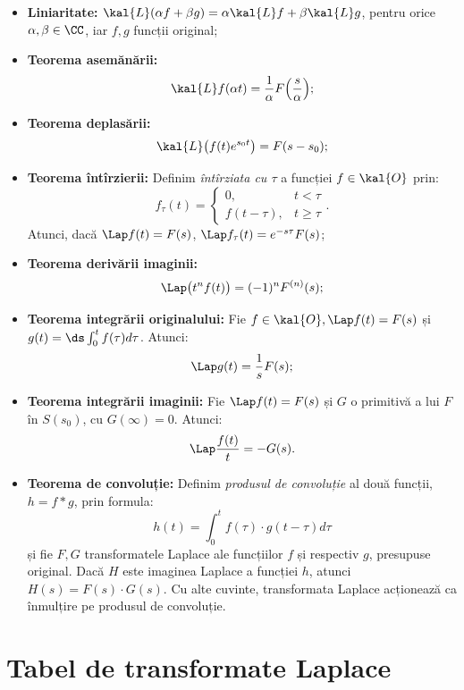 \begin{itemize}
\item \textbf{Liniaritate:} $ \kal{L}(\alpha f + \beta g) = \alpha \kal{L} f + \beta \kal{L} g $,
  pentru orice $ \alpha, \beta \in \CC $, iar $ f, g $ funcții original;
\item \textbf{Teorema asemănării:}
  \[
    \kal{L} f(\alpha t) = \dfrac{1}{\alpha} F \Big( \dfrac{s}{\alpha} \Big);
  \]
\item \textbf{Teorema deplasării:}
  \[
    \kal{L} \big( f(t) e^{s_0t} \big) = F(s - s_0);
  \]
\item \textbf{Teorema întîrzierii:} Definim \emph{întîrziata cu $ \tau $ } a funcției
  $ f \in \kal{O} $ prin:
  \[
    f_\tau(t) =
    \begin{cases}
      0, & t < \tau \\
      f(t - \tau), & t \geq \tau
    \end{cases}.
  \]
  Atunci, dacă $ \Lap f(t) = F(s) $, $ \Lap f_\tau (t) = e^{-s\tau} F(s) $;
\item \textbf{Teorema derivării imaginii:}
  \[
    \Lap \big( t^n f(t) \big) = (-1)^n F^{(n)} (s);
  \]
\item \textbf{Teorema integrării originalului:} Fie $ f \in \kal{O}, \Lap f(t) = F(s) $ și
  $ g(t) = \ds\int_0^t f(\tau) d\tau $. Atunci:
  \[
    \Lap g(t) = \dfrac{1}{s} F(s);
\]
\item \textbf{Teorema integrării imaginii:} Fie $ \Lap f(t) = F(s) $ și $ G $ o primitivă a
    lui $ F $ în $ S(s_0) $, cu $ G(\infty) = 0 $. Atunci:
    \[
        \Lap \dfrac{f(t)}{t} = -G(s).
    \]

\item \textbf{Teorema de convoluție:} Definim \emph{produsul de convoluție} al două
    funcții, $ h = f \ast g $, prin formula:
    \[
        h(t) = \int_0^t f(\tau) \cdot g(t - \tau) d\tau
    \]
    și fie $ F, G $ transformatele Laplace ale funcțiilor $ f $ și respectiv $ g $,
    presupuse original. Dacă $ H $ este imaginea Laplace a funcției $ h $, atunci
    $ H(s) = F(s) \cdot G(s) $. Cu alte cuvinte, transformata Laplace acționează
    ca înmulțire pe produsul de convoluție.
\end{itemize}

\newpage
\section{Tabel de transformate Laplace}

